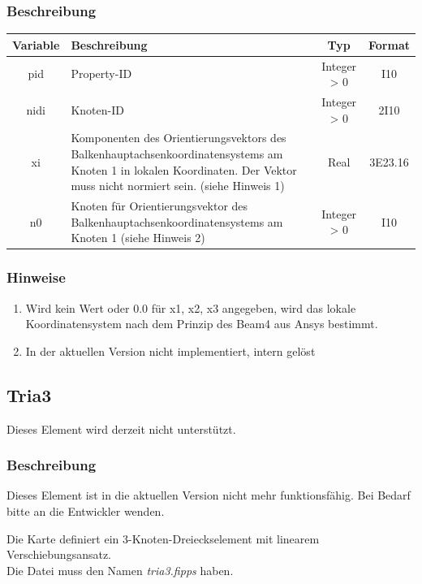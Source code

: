 \documentclass[11pt,titlepage,listof=totoc,bibliography=totoc,twoside]{scrreprt}
\begin{document}
{{\subsubsection{Beschreibung}

\begin{tabularx}{\textwidth}{cXcc}
\toprule
Variable& Beschreibung					& Typ			& Format\\
\midrule
pid		& Property-ID				& Integer > 0	& I10	\\
nidi		& Knoten-ID				& Integer > 0	& 2I10	\\
xi   		& Komponenten des Orientierungsvektors des Balkenhauptachsenkoordinatensystems am Knoten 1 in lokalen Koordinaten. Der Vektor muss nicht normiert sein. (siehe Hinweis 1)	& Real			& 3E23.16\\
n0		& Knoten für Orientierungsvektor des Balkenhauptachsenkoordinatensystems am Knoten 1 (siehe Hinweis 2)					& Integer > 0	& I10	\\
\bottomrule
\end{tabularx}

\subsubsection{Hinweise}

\begin{enumerate}
\item Wird kein Wert oder 0.0 für x1, x2, x3 angegeben, wird das lokale Koordinatensystem nach dem Prinzip des Beam4 aus Ansys bestimmt. 
\item In der aktuellen Version nicht implementiert, intern gelöst
\end{enumerate}

\newpage

\subsection{Tria3}

Dieses Element wird derzeit nicht unterstützt.

\subsubsection{Beschreibung}

Dieses Element ist in die aktuellen Version nicht mehr funktionsfähig. Bei Bedarf bitte an die Entwickler wenden.

Die Karte definiert ein 3-Knoten-Dreieckselement mit linearem Verschiebungsansatz.\\
Die Datei muss den Namen \emph{tria3.fipps} haben.

}}
\end{document}

